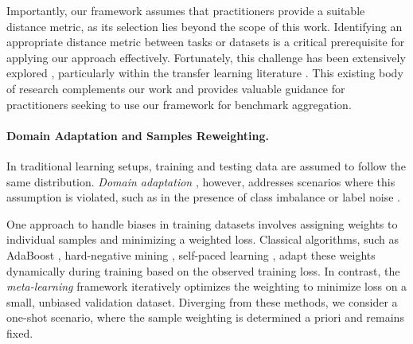  
Importantly, our framework assumes that practitioners provide a suitable distance metric, as its selection lies beyond the scope of this work.
Identifying an appropriate distance metric between tasks or datasets is a critical prerequisite for applying our approach effectively. 
Fortunately, this challenge has been extensively explored 
\cite{alvarez-melis_geometric_2020,gretton_kernel_2012,liu_wasserstein_2022}, particularly within the transfer learning literature \cite{achille_task2vec_2019,peng_domain2vec_2020}. 
This existing body of research complements our work and provides valuable guidance for practitioners seeking to use our framework for benchmark aggregation.








\paragraph{Domain Adaptation and Samples Reweighting.}

In traditional learning setups, training and testing data are assumed to follow the same distribution. \emph{Domain adaptation} \cite{wang_deep_2018}, however, addresses scenarios where this assumption is violated, such as in the presence of class imbalance or label noise \cite{torralba_unbiased_2011}.

One approach to handle biases in training datasets involves assigning weights to individual samples and minimizing a weighted loss. Classical algorithms, such as AdaBoost \cite{freund_decision-theoretic_1997}, hard-negative mining \cite{chang_active_2018},
self-paced learning \cite{jiang_self-paced_2015}, adapt these weights dynamically during training based on the observed training loss. In contrast, the \emph{meta-learning} framework \cite{jamal_rethinking_2020,ren_learning_2019,shu_meta-weight-net_2019}
%
iteratively optimizes the weighting 
to minimize loss on a small, unbiased validation dataset. Diverging from these methods, we consider a one-shot scenario, where the sample weighting is determined a priori and remains fixed.


